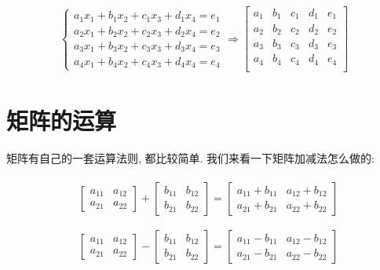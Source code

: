 \begin{align*}
	\begin{cases}
		a_1x_1+b_1x_2+c_1x_3+d_1x_4=e_1 \\
		a_2x_1+b_2x_2+c_2x_3+d_2x_4=e_2 \\
		a_3x_1+b_3x_2+c_3x_3+d_3x_4=e_3 \\
		a_4x_1+b_4x_2+c_4x_3+d_4x_4=e_4 
	\end{cases}
  \Rightarrow
  \begin{bmatrix}
      a_{1} & b_{1} & c_{1} & d_{1} & e_{1} \\
      a_{2} & b_{2} & c_{2} & d_{2} & e_{2} \\
      a_{3} & b_{3} & c_{3} & d_{3} & e_{3} \\
      a_{4} & b_{4} & c_{4} & d_{4} & e_{4} \\
  \end{bmatrix}
\end{align*}

\section{矩阵的运算}

矩阵有自己的一套运算法则, 都比较简单. 我们来看一下矩阵加减法怎么做的:

\begin{align*}
  & \begin{split} \begin{bmatrix} a_{11} & a_{12} \\ a_{21} & a_{22} \end{bmatrix} + \begin{bmatrix} b_{11} & b_{12} \\ b_{21} & b_{22} \end{bmatrix}=\begin{bmatrix} a_{11}+b_{11} & a_{12}+b_{12} \\ a_{21}+b_{21} & a_{22}+b_{22} \end{bmatrix} \end{split} \\ \\
  & \begin{split} \begin{bmatrix} a_{11} & a_{12} \\ a_{21} & a_{22} \end{bmatrix} - \begin{bmatrix} b_{11} & b_{12} \\ b_{21} & b_{22} \end{bmatrix}=\begin{bmatrix} a_{11}-b_{11} & a_{12}-b_{12} \\ a_{21}-b_{21} & a_{22}-b_{22} \end{bmatrix} \end{split}
\end{align*}

